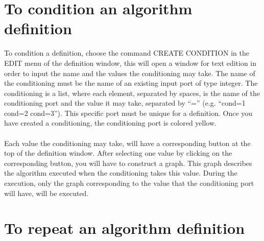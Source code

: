 \documentclass[11pt,twoside]{report}
\begin{document}
\section{To condition an algorithm definition}
To condition a definition, choose the command CREATE CONDITION in the
EDIT menu of the definition window, this will open a window for text
edition in order to input the name and the values the conditioning may
take. The name of the conditioning must be the name of an existing
input port of type integer. The conditioning is a list, where each
element, separated by spaces, is the name of the conditioning port and
the value it may take, separated by ``='' (e.g. ``cond=1 cond=2
cond=3''). This specific port must be unique for a definition. Once
you have created a conditioning, the
conditioning port is colored yellow.\\\\
Each value the conditioning may take, will have a corresponding button
at the top of the definition window. After selecting one value by
clicking on the corresponding button, you will have to construct a
graph. This graph describes the algorithm executed when the
conditioning takes this value. During the execution, only the graph
corresponding to the value that the conditioning port will have, will
be executed.

\section{To repeat an algorithm definition}
\end{document}
